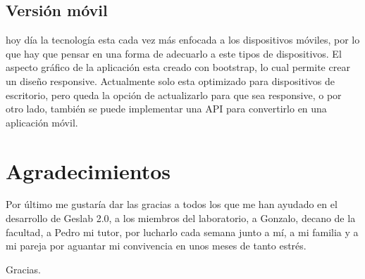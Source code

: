 \subsection{Versión móvil}
hoy día la tecnología esta cada vez más enfocada a los dispositivos móviles, por lo que hay que pensar en una forma de adecuarlo a este tipos de dispositivos. El aspecto gráfico de la aplicación esta creado con bootstrap, lo cual permite crear un diseño responsive. Actualmente solo esta optimizado para dispositivos de escritorio, pero queda la opción de actualizarlo para que sea responsive, o por otro lado, también se puede implementar una API para convertirlo en una aplicación móvil. 


\section{Agradecimientos}

Por último me gustaría dar las gracias a todos los que me han ayudado en el desarrollo de Geslab 2.0, a los miembros del laboratorio, a Gonzalo, decano de la facultad, a Pedro mi tutor, por lucharlo cada semana junto a mí, a mi familia y a mi pareja por aguantar mi convivencia en unos meses de tanto estrés. 

Gracias.